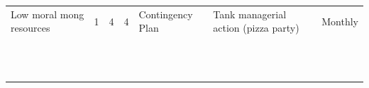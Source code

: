 \begin{landscape}
\begin{table}[H]
{\begin{tabular}{lllllll}
Low moral mong resources & 1 & 4 & 4 & \cellcolor[HTML]{34FF34}Contingency Plan & Tank managerial action (pizza party) & Monthly \\
 &  &  &  &  &  &  \\
 &  &  &  &  &  &  \\
 &  &  &  &  &  &  \\
 &  &  &  &  &  &  \\
 &  &  &  &  &  &  \\
 &  &  &  &  &  &  \\
 &  &  &  &  &  &  \\
 &  &  &  &  &  &  \\
 &  &  &  &  &  &  \\
 &  &  &  &  &  &  \\
 &  &  &  &  &  &  \\
 &  &  &  &  &  &  \\ \hline
\end{tabular}%
}
\end{table}

\end{landscape}

